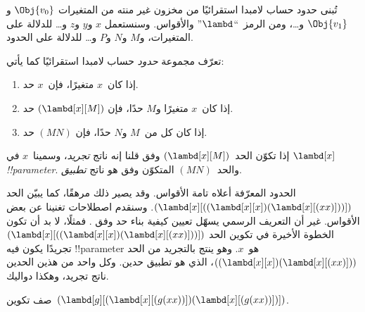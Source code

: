 \documentclass[../../../include/open-logic-section]{subfiles}
\begin{document}

تُبنى حدود حساب لامبدا استقرائيًا من مخزون غير منته من المتغيرات
$\Obj{v_0}$ و$\Obj{v_1}$ و\dots، ومن الرمز~``$\lambd$'' والأقواس. وسنستعمل
$x$ و$y$ و$z$ و\dots{} للدلالة على المتغيرات، و$M$ و$N$ و$P$ و\dots{}
للدلالة على الحدود.

\begin{defn}[الحدود] 
تعرّف مجموعة \emph{حدود} حساب لامبدا استقرائيًا كما يأتي:
\begin{enumerate}
  \item {} إذا كان~$x$ متغيرًا، فإن~$x$ حد.
  \item {} إذا كان~$x$ متغيرًا و$M$ حدًا، فإن
    $(\lambd[x][M])$ حد.
  \item {} إذا كان كل من~$M$ و$N$ حدًا، فإن
    $(MN)$ حد.
\end{enumerate}
\end{defn}

إذا تكوّن الحد~$(\lambd[x][M])$ وفق
 قلنا إنه ناتج \emph{تجريد}، وسمينا~$x$ في
$\lambd[x]$ \emph{!!{parameter}}. والحد~$(MN)$ المتكوّن وفق
 هو ناتج \emph{تطبيق}.

الحدود المعرّفة أعلاه تامة الأقواس. وقد يصير ذلك مرهقًا، كما يبيّن الحد
$(\lambd[x][((\lambd[x][x])(\lambd[x][(xx)]))])$. وسنقدم اصطلاحات تغنينا
عن بعض الأقواس. غير أن التعريف الرسمي يسهّل تعيين كيفية بناء حد وفق
. فمثلًا، لا بد أن تكون الخطوة الأخيرة في تكوين الحد
$(\lambd[x][((\lambd[x][x])(\lambd[x][(xx)]))])$ تجريدًا يكون فيه
!!{parameter} هو~$x$. وهو ينتج بالتجريد من الحد
$((\lambd[x][x])(\lambd[x][(xx)]))$، الذي هو تطبيق حدين. وكل واحد من
هذين الحدين ناتج تجريد، وهكذا دواليك.

\begin{prob}
صف تكوين~$(\lambd[g][(\lambd[x][(g (x x))])
  (\lambd[x][(g (x x))])])$.
\end{prob}
\end{document}

